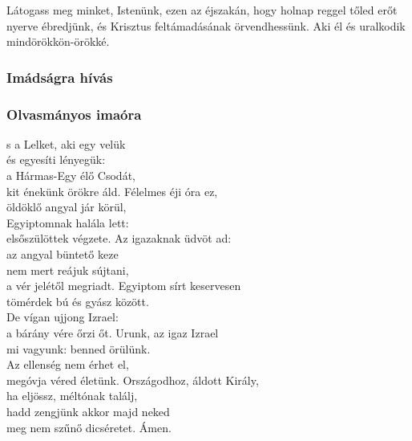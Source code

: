 \documentclass[twoside]{article}
\begin{document}
Látogass meg minket, Istenünk, ezen az éjszakán, hogy holnap reggel tőled erőt nyerve ébredjünk, és
Krisztus feltámadásának örvendhessünk. Aki él és uralkodik mindörökkön-örökké.

\subsubsection*{Imádságra hívás}

\label{D/Inv}



\subsubsection*{Olvasmányos imaóra}



\begin{hymnstanzas}
    s a Lelket, aki egy velük\\
    és egyesíti lényegük:\\
    a Hármas-Egy élő Csodát,\\
    kit énekünk örökre áld.
\stanzabreak
    Félelmes éji óra ez,\\
    öldöklő angyal jár körül,\\
    Egyiptomnak halála lett:\\
    elsőszülöttek végzete.
\stanzabreak
    Az igazaknak üdvöt ad:\\
    az angyal büntető keze\\
    nem mert reájuk sújtani,\\
    a vér jelétől megriadt.
\stanzabreak
    Egyiptom sírt keservesen\\
    tömérdek bú és gyász között.\\
    De vígan ujjong Izrael:\\
    a bárány vére őrzi őt.
\stanzabreak
    Urunk, az igaz Izrael\\
    mi vagyunk: benned örülünk.\\
    Az ellenség nem érhet el,\\
    megóvja véred életünk.
\stanzabreak
    Országodhoz, áldott Király,\\
    ha eljössz, méltónak találj,\\
    hadd zengjünk akkor majd neked\\
    meg nem szűnő dicséretet. Ámen.
\end{hymnstanzas}
\end{document}
